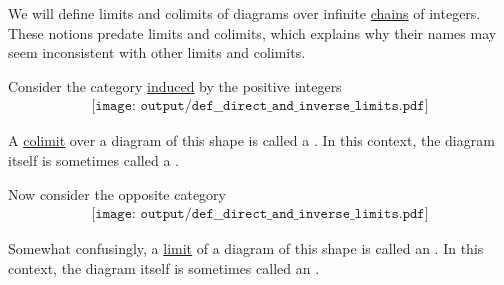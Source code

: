 \begin{definition}\label{def:direct_and_inverse_limits}
  We will define limits and colimits of diagrams over infinite \hyperref[def:partially_ordered_set_chain_and_antichain]{chains} of integers. These notions predate limits and colimits, which explains why their names may seem inconsistent with other limits and colimits.

  \begin{thmenum}
     Consider the category \hyperref[thm:order_category_isomorphism]{induced} by the positive integers
    \begin{equation}\label{eq:def:direct_and_inverse_limits/direct}
      \begin{aligned}
        \texttt{[image: output/def\_\_direct\_and\_inverse\_limits.pdf]}
      \end{aligned}
    \end{equation}

    A \hyperref[def:category_of_cones/colimit]{colimit} over a diagram of this shape is called a . In this context, the diagram itself is sometimes called a .

     Now consider the opposite category
    \begin{equation}\label{eq:def:direct_and_inverse_limits/inverse}
      \begin{aligned}
        \texttt{[image: output/def\_\_direct\_and\_inverse\_limits.pdf]}
      \end{aligned}
    \end{equation}

    Somewhat confusingly, a \hyperref[def:category_of_cones/limit]{limit} of a diagram of this shape is called an . In this context, the diagram itself is sometimes called an .
  \end{thmenum}
\end{definition}

